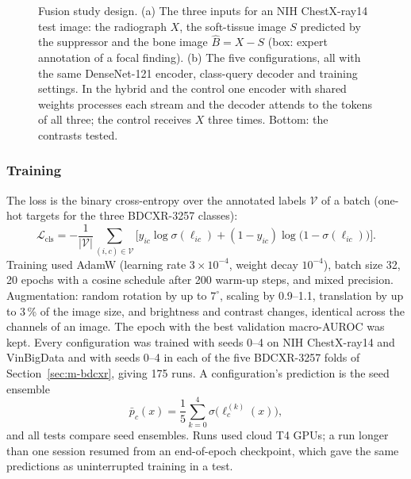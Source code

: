 \begin{figure}[!t]
\centering
{}
\caption{Fusion study design. (a) The three inputs for an NIH ChestX-ray14 test image: the radiograph $X$, the soft-tissue image $S$
predicted by the suppressor and the bone image $\hat B=X-S$ (box: expert annotation of a focal finding). (b) The five configurations, all
with the same DenseNet-121 encoder, class-query decoder and training settings. In the hybrid and the control one encoder with shared
weights processes each stream and the decoder attends to the tokens of all three; the control receives $X$ three times. Bottom: the
contrasts tested.}
\label{fig:cls_design}
\end{figure}

\subsubsection{Training}
The loss is the binary cross-entropy over the annotated labels $\mathcal{V}$ of a batch (one-hot targets for the three BDCXR-3257 classes):
\begin{equation}
\mathcal{L}_{\mathrm{cls}}=-\frac{1}{|\mathcal{V}|}\sum_{(i,c)\in\mathcal{V}}\Big[y_{ic}\log\sigma(\ell_{ic})+(1-y_{ic})\log\big(1-\sigma(\ell_{ic})\big)\Big].
\label{eq:bce}
\end{equation}
Training used AdamW \cite{loshchilov2019adamw} (learning rate $3\times10^{-4}$, weight decay $10^{-4}$), batch size 32, 20 epochs with a
cosine schedule after 200 warm-up steps, and mixed precision. Augmentation: random rotation by up to $7^\circ$, scaling by 0.9--1.1,
translation by up to 3\,\% of the image size, and brightness and contrast changes, identical across the channels of an image. The epoch with
the best validation macro-AUROC was kept. Every configuration was trained with seeds 0--4 on NIH ChestX-ray14 and VinBigData and with seeds
0--4 in each of the five BDCXR-3257 folds of Section~\ref{sec:m-bdcxr}, giving 175 runs. A configuration's prediction is the seed ensemble
\begin{equation}
\bar p_c(x)=\frac15\sum_{k=0}^{4}\sigma\big(\ell^{(k)}_c(x)\big),
\label{eq:seedens}
\end{equation}
and all tests compare seed ensembles. Runs used cloud T4 GPUs; a run longer than one session resumed from an end-of-epoch checkpoint, which
gave the same predictions as uninterrupted training in a test.

